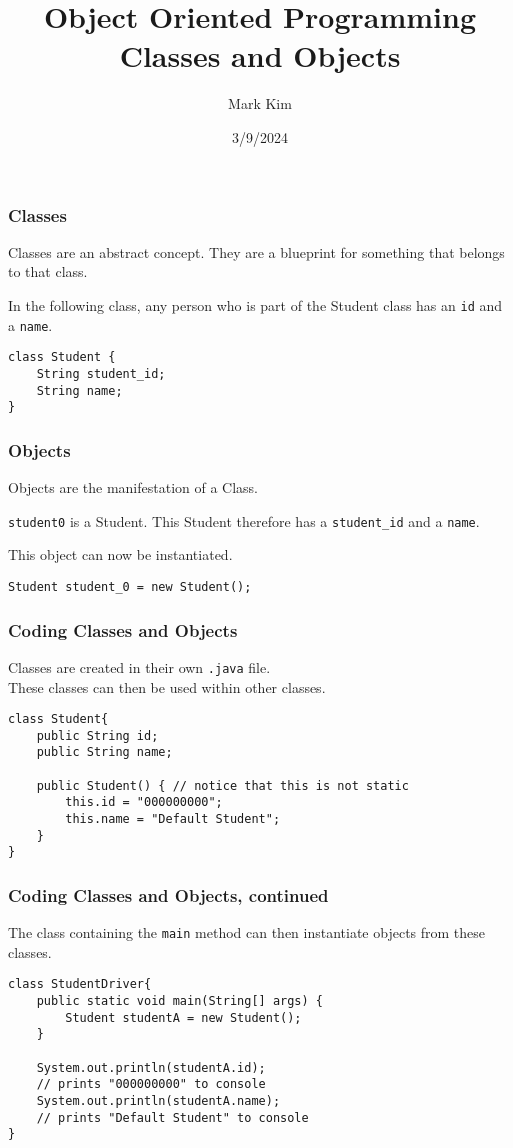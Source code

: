 \documentclass[aspectratio=169]{beamer}
\title{Object Oriented Programming\\
\large Classes and Objects}
\author{Mark Kim}
\institute{San Francisco State University}
\date{3/9/2024}
\begin{document}
\frame{\titlepage}

\begin{frame}[fragile]
\frametitle{Classes}
Classes are an \alert{abstract} concept.  They are a blueprint for something
that belongs to that class.
\begin{example}
    In the following class, any person who is part of the Student class has
    an \verb|id| and a \verb|name|.
\begin{lstlisting}
class Student {
    String student_id;
    String name;
}
\end{lstlisting}
\end{example}
\end{frame}

\begin{frame}[fragile]
\frametitle{Objects}
Objects are the \alert{manifestation} of a Class.
\begin{example}
    \verb|student0| is a Student.  This Student therefore has a \verb|student_id| and a \verb|name|.
\end{example}
\vspace*{4mm}
This object can now be \alert{instantiated}.
\begin{example}
\begin{lstlisting}
Student student_0 = new Student();
\end{lstlisting}
\end{example}
\end{frame}

\begin{frame}[fragile]
\frametitle{Coding Classes and Objects}
Classes are created in their own \verb|.java| file.\\
These classes can then be used within other classes.

\begin{example}
\begin{lstlisting}
class Student{
    public String id;
    public String name;

    public Student() { // notice that this is not static
        this.id = "000000000";
        this.name = "Default Student";
    }
}
\end{lstlisting}
\end{example}
\end{frame}

\begin{frame}[fragile]
\frametitle{Coding Classes and Objects, continued}
The class containing the \verb|main| method can then instantiate
objects from these classes.
\begin{example}
\begin{lstlisting}
class StudentDriver{
    public static void main(String[] args) {
        Student studentA = new Student();
    }

    System.out.println(studentA.id);
    // prints "000000000" to console
    System.out.println(studentA.name);
    // prints "Default Student" to console
}
\end{lstlisting}
\end{example}
\end{frame}
\end{document}
